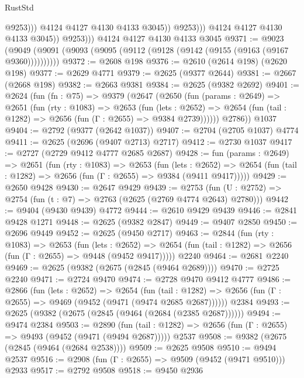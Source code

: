 \begin{lexlean}{RustStd}
\begin{coremodule}
                              @9253)))
                        @4124
                        @4127
                        @4130
                        @4133
                        @3045))
                    @9253)))
              @4124
              @4127
              @4130
              @4133
              @3045))
          @9253)))
    @4124
    @4127
    @4130
    @4133
    @3045
@9371 := @9023 (@9049 (@9091 (@9093 (@9095 (@9112 (@9128 (@9142 (@9155 (@9163 (@9167 @9360))))))))))
@9372 := @2608 @198
@9376 := @2610 (@2614 @198) (@2620 @198)
@9377 := @2629 @4771
@9379 := @2625 (@9377 @2644)
@9381 := @2667 (@2668 @198)
@9382 := @2663 @9381
@9384 := @2625 (@9382 @2692)
@9401 := @2624
    (fun (fn : @75) =>
    @9379
      (@2647
        (@2650
          (fun (params : @2649) =>
          @2651
            (fun (rty : @1083) =>
            @2653
              (fun (lets : @2652) =>
              @2654 (fun (tail : @1282) => @2656 (fun (Γ : @2655) => @9384 @2739))))))
        @2786))
    @1037
@9404 := @2792 (@9377 (@2642 @1037))
@9407 := @2704 (@2705 @1037) @4774
@9411 := @2625 (@2696 (@9407 @2713) @2717)
@9412 := @2730 @1037
@9417 := @2727 (@2729 @9412 @4777 @2685 @2687)
@9428 := fun (params : @2649) =>
  @2651
    (fun (rty : @1083) =>
    @2653
      (fun (lets : @2652) =>
      @2654 (fun (tail : @1282) => @2656 (fun (Γ : @2655) => @9384 (@9411 @9417)))))
@9429 := @2650 @9428
@9430 := @2647 @9429
@9439 := @2753 (fun (U : @2752) => @2754 (fun (t : @7) => @2763 (@2625 (@2769 @4774 @2643) @2780)))
@9442 := @9404 (@9430 @9439) @4772
@9444 := @2610 @9429 @9439
@9446 := @2841 @9428 @1271
@9448 := @2625 (@9382 @2847)
@9449 := @9407 @2850
@9450 := @2696 @9449
@9452 := @2625 (@9450 @2717)
@9463 := @2844
    (fun (rty : @1083) =>
    @2653
      (fun (lets : @2652) =>
      @2654 (fun (tail : @1282) => @2656 (fun (Γ : @2655) => @9448 (@9452 @9417)))))
    @2240
@9464 := @2681 @2240
@9469 := @2625 (@9382 (@2675 (@2845 (@9464 @2689))))
@9470 := @2725 @2240
@9471 := @2724 @9470
@9474 := @2728 @9470 @9412 @4777
@9486 := @2866
    (fun (lets : @2652) =>
    @2654
      (fun (tail : @1282) => @2656 (fun (Γ : @2655) => @9469 (@9452 (@9471 (@9474 @2685 @2687))))))
    @2384
@9493 := @2625 (@9382 (@2675 (@2845 (@9464 (@2684 (@2385 @2687))))))
@9494 := @9474 @2384
@9503 := @2890
    (fun (tail : @1282) => @2656 (fun (Γ : @2655) => @9493 (@9452 (@9471 (@9494 @2687)))))
    @2537
@9508 := @9382 (@2675 (@2845 (@9464 (@2684 @2538))))
@9509 := @2625 @9508
@9510 := @9494 @2537
@9516 := @2908 (fun (Γ : @2655) => @9509 (@9452 (@9471 @9510))) @2933
@9517 := @2792 @9508
@9518 := @9450 @2936

\end{coremodule}
\end{lexlean}
